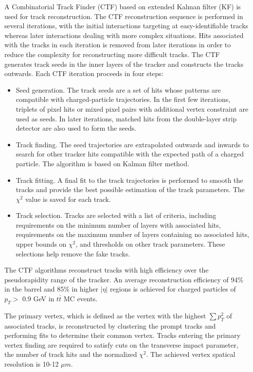 \documentclass[thesis.tex]{subfiles}
\begin{document}
A Combinatorial Track Finder (CTF) based on extended Kalman filter (KF) is used for track reconstruction. 
The CTF reconstruction sequence is performed in several iterations, with the initial interactions targeting at easy-identifiable tracks whereas later interactions dealing with more complex situations. 
Hits associated with the tracks in each iteration is removed from later iterations in order to reduce the complexity for reconstructing more difficult tracks. 
The CTF generates track seeds in the inner layers of the tracker and constructs the tracks outwards. 
Each CTF iteration proceeds in four steps:

\begin{itemize}
	\item Seed generation. The track seeds are a set of hits whose patterns are compatible with charged-particle trajectories. 
		In the first few iterations, triplets of pixel hits or mixed pixel pairs with additional vertex constraint are used as seeds. 
		In later iterations, matched hits from the double-layer strip detector are also used to form the seeds. 
	\item Track finding. The seed trajectories are extrapolated outwards and inwards to search for other tracker hits compatible with the expected path of a charged particle. The algorithm is based on Kalman filter method. 
	\item Track fitting. A final fit to the track trajectories is performed to smooth the tracks and provide the best possible estimation of the track parameters. The $\chi^2$ value is saved for each track.
	\item Track selection. Tracks are selected with a list of criteria, including requirements on the minimum number of layers with associated hits, requirements on the maximum number of layers containing no associated hits, upper bounds on $\chi^2$, and thresholds on other track parameters. These selections help remove the fake tracks. 
\end{itemize}

The CTF algorithms reconstruct tracks with high efficiency over the pseudorapidity range of the tracker.
An average reconstruction efficiency of 94\% in the barrel and 85\% in higher $|\eta|$ regions is achieved for charged particles of $p_T >$ 0.9 GeV in $t\bar{t}$ MC events. 

The primary vertex, which is defined as the vertex with the highest $\sum p_T^2$ of associated tracks, is reconstructed by clustering the prompt tracks and performing fits to determine their common vertex. 
Tracks entering the primary vertex finding are required to satisfy cuts on the transverse impact parameter, the number of track hits and the normalized $\chi^2$.
The achieved vertex spatical resolution is 10-12 $\mu m$.
\end{document}
